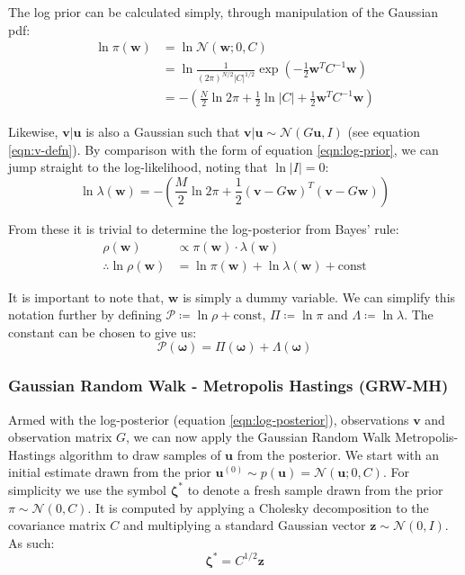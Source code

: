 \documentclass[]{article}
\newcommand{\Ncal}{\mathcal{N}}
\newcommand{\lik}{\lambda}
\newcommand{\loglik}{\Lambda}
\newcommand{\ubold}{\boldsymbol{u}}
\newcommand{\vbold}{\boldsymbol{v}}
\newcommand{\wbold}{\boldsymbol{w}}
\newcommand{\zbold}{\boldsymbol{z}}
\newcommand{\zetabold}{\boldsymbol{\zeta^*}}
\newcommand{\omegabold}{\boldsymbol{\omega}}
\newcommand{\Rho}{\mathcal{P}}
\begin{document}
The log prior can be calculated simply, through manipulation of the Gaussian pdf:
%
\begin{align}
	\ln \pi (\wbold) &= \ln \Ncal(\wbold; 0, C) \nonumber \\
	&= \ln \frac{1}{(2\pi)^{N/2} |C|^{1/2}} \exp \left( - \frac{1}{2} \wbold^T C^{-1} \wbold \right) \nonumber \\
	&= - \left( \frac{N}{2} \ln 2\pi + \frac{1}{2} \ln |C| + \frac{1}{2} \wbold^T C^{-1} \wbold \right)
	\label{eqn:log-prior}
\end{align}

Likewise, $\vbold | \ubold$ is also a Gaussian such that $\vbold |\ubold \sim \Ncal(G\ubold, I)$ (see equation \ref{eqn:v-defn}). By comparison with the form of equation \ref{eqn:log-prior}, we can jump straight to the log-likelihood, noting that $\ln |I| = 0$:
%
\begin{equation}
	\ln \lik(\wbold) = - \left( \frac{M}{2} \ln 2 \pi + \frac{1}{2} \left(\vbold - G\wbold \right)^T \left(\vbold - G\wbold\right)\right)
	\label{eqn:log-likelihood}
\end{equation}

From these it is trivial to determine the log-posterior from Bayes' rule:
%
\begin{align}
	\rho(\wbold) &\propto \pi(\wbold) \cdot \lik(\wbold) \nonumber \\
	\therefore \ln \rho(\wbold) &= \ln \pi(\wbold) + \ln \lik(\wbold) + \textrm{const}
\end{align}

It is important to note that, $\wbold$ is simply a dummy variable. We can simplify this notation further by defining $\Rho \coloneqq \ln \rho + \textrm{const}$, $\Pi \coloneqq \ln \pi$ and $\loglik \coloneqq \ln \lik$. The constant can be chosen to give us:
%
\begin{equation}
	\Rho(\omegabold) = \Pi(\omegabold) + \loglik(\omegabold)
	\label{eqn:log-posterior}
\end{equation}

\subsubsection{Gaussian Random Walk - Metropolis Hastings (GRW-MH)}

Armed with the log-posterior (equation \ref{eqn:log-posterior}), observations $\vbold$ and observation matrix $G$, we can now apply the Gaussian Random Walk Metropolis-Hastings algorithm to draw samples of $\ubold$ from the posterior. We start with an initial estimate drawn from the prior $\ubold^{(0)} \sim p(\ubold) = \Ncal(\ubold; 0, C)$. For simplicity we use the symbol $\zetabold$ to denote a fresh sample drawn from the prior $\pi \sim \Ncal(0, C)$. It is computed by applying a Cholesky decomposition to the covariance matrix $C$ and multiplying a standard Gaussian vector $\zbold \sim \Ncal(0, I)$. As such:
%
\begin{equation}
	\zetabold = C^{1/2} \zbold
	\label{eqn:zeta}
\end{equation}
\end{document}
